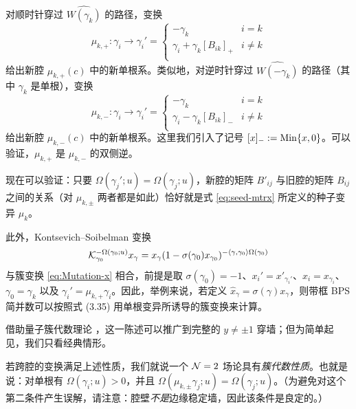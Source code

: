 对顺时针穿过 $\widehat{W(\gamma_k)}$ 的路径，变换
%
\begin{equation}\label{eq:charge-mutation}
\mu_{k,+}: \gamma_i \to \gamma_i' = \begin{cases} - \gamma_k & i=k \\   \gamma_i + \gamma_k [B_{ik}]_+  & i \not=k\\
\end{cases}
\end{equation}
%
给出新腔 $\mu_{k,+}(c)$ 中的新单根系。类似地，对逆时针穿过 $\widehat{W(-\gamma_k)}$ 的路径（其中 $\gamma_k$ 是单根），变换
%
\begin{equation}
\mu_{k,-}: \gamma_i \to \gamma_i' = \begin{cases} - \gamma_k & i=k \\   \gamma_i - \gamma_k [B_{ik}]_-  & i \not=k\\
\end{cases}
\end{equation}
%
给出新腔 $\mu_{k,-}(c)$ 中的新单根系。这里我们引入了记号 $[x]_- := {\rm Min}\{x,0\}$。可以验证，$\mu_{k,+}$ 是 $\mu_{k,-}$ 的双侧逆。

现在可以验证：只要 $\Omega(\gamma_j';u) = \Omega(\gamma_j;u)$，新腔的矩阵 $B'_{ij}$ 与旧腔的矩阵 $B_{ij}$ 之间的关系（对 $\mu_{k,\pm}$ 两者都是如此）恰好就是式 \eqref{eq:seed-mtrx} 所定义的种子变异 $\mu_k$。

此外，Kontsevich--Soibelman 变换
%
\begin{equation}
\mathcal{K}_{\gamma_0}^{-\Omega(\gamma_0;u)} x_\gamma = x_{\gamma} (1-\sigma(\gamma_0) x_{\gamma_0})^{-\langle \gamma,\gamma_0\rangle \Omega(\gamma_0)}
\end{equation}
%
与簇变换 \eqref{eq:Mutation-x} 相合，前提是取 $\sigma(\gamma_0)=-1$、$x_i' = x'_{\gamma_i'}$、$x_i = x_{\gamma_i}$、$\gamma_0 = \gamma_k$ 以及 $\gamma_i' = \mu_{k,+}\gamma_i$。因此，举例来说，若定义 $\hat x_{\gamma} = \sigma(\gamma) x_{\gamma}$，则带框 BPS 简并数可以按照式 (3.35)%
用单根变异所诱导的簇变换来计算。

借助量子簇代数理论 \cite{MR2233852}，这一陈述可以推广到完整的 $y \neq \pm 1$ 穿墙；但为简单起见，我们只看经典情形。

若跨腔的变换满足上述性质，我们就说一个 $\mathcal{N}=2$ 场论具有\emph{簇代数性质}。也就是说：对单根有 $\Omega(\gamma_i;u)>0$，并且 $\Omega(\mu_{k,\pm} \gamma_j;u) = \Omega(\gamma_j;u)$。（为避免对这个第二条件产生误解，请注意：腔壁\emph{不是}边缘稳定墙，因此该条件是良定的。）

